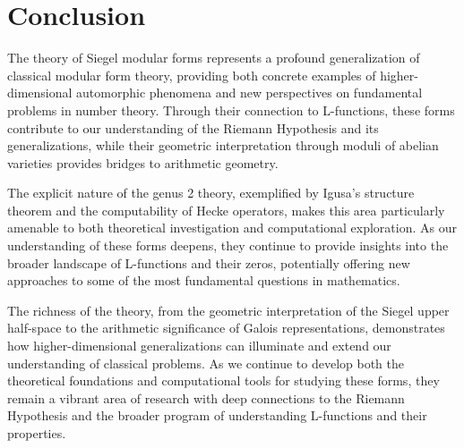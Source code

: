 \section{Conclusion}

The theory of Siegel modular forms represents a profound generalization of classical modular form theory, providing both concrete examples of higher-dimensional automorphic phenomena and new perspectives on fundamental problems in number theory. Through their connection to L-functions, these forms contribute to our understanding of the Riemann Hypothesis and its generalizations, while their geometric interpretation through moduli of abelian varieties provides bridges to arithmetic geometry.

The explicit nature of the genus 2 theory, exemplified by Igusa's structure theorem and the computability of Hecke operators, makes this area particularly amenable to both theoretical investigation and computational exploration. As our understanding of these forms deepens, they continue to provide insights into the broader landscape of L-functions and their zeros, potentially offering new approaches to some of the most fundamental questions in mathematics.

The richness of the theory, from the geometric interpretation of the Siegel upper half-space to the arithmetic significance of Galois representations, demonstrates how higher-dimensional generalizations can illuminate and extend our understanding of classical problems. As we continue to develop both the theoretical foundations and computational tools for studying these forms, they remain a vibrant area of research with deep connections to the Riemann Hypothesis and the broader program of understanding L-functions and their properties.